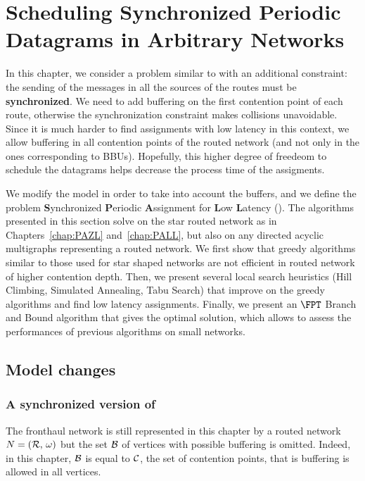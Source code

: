 
\chapter{Scheduling Synchronized Periodic Datagrams in Arbitrary Networks }
\label{chap:SPALL}

\minitoc

In this chapter, we consider a problem similar to \pall with an additional constraint: the sending of the messages in all the sources of the routes must be \textbf{synchronized}. We need to add buffering on the first contention point of each route, otherwise the synchronization constraint makes collisions unavoidable. Since it is much harder to find assignments with low latency in this context, we allow buffering in all contention points of the routed network (and not only in the ones corresponding to BBUs). Hopefully, this higher degree of freedeom to schedule the datagrams helps decrease the process time of the assigments.

We modify the model in order to take into account the buffers, and we define the problem \textbf{S}ynchronized \textbf{P}eriodic \textbf{A}ssignment for \textbf{L}ow \textbf{L}atency (\spall). The algorithms presented in this section solve \spall on the star routed network as in Chapters~\ref{chap:PAZL} and~\ref{chap:PALL}, but also on any directed acyclic multigraphs representing a routed network. We first show that greedy algorithms similar to those used for star shaped networks are not efficient in routed network of higher contention depth. Then, we present several local search heuristics (Hill Climbing, Simulated Annealing, Tabu Search) that improve on the greedy algorithms and find low latency assignments. Finally, we present an $\FPT$ Branch and Bound algorithm that gives the optimal solution, which allows to assess the performances of previous algorithms on small networks.


\section{Model changes}
\subsection{A synchronized version of \pall}

The fronthaul network is still represented in this chapter by a routed network $N = ({\cal R},\,\omega)$ but the set ${\cal B}$ of vertices with possible buffering is omitted. Indeed, in this chapter, ${\cal B}$ is equal to ${\cal C}$, the set of contention points, that is buffering is allowed in all vertices. 


